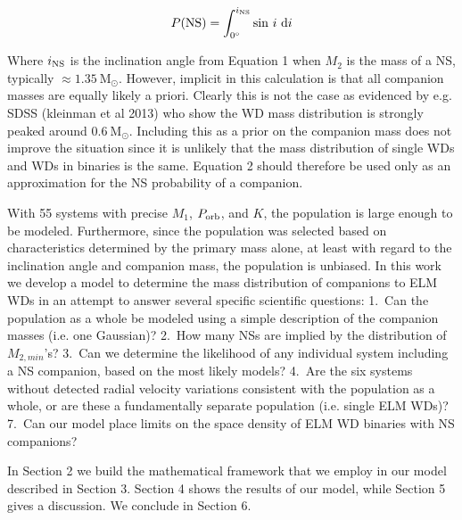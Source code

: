 \documentclass[letterpaper,12pt,preprint]{aastex}
\newcommand{\Msun}{\mathrm{M}_\odot}
\begin{document}
\begin{equation}
P({\rm NS}) = \int_{0^{\circ}}^{i_{\rm NS}} {\rm sin}\ i\ {\rm d}i
\end{equation}

Where $i_{\rm NS}$ is the inclination angle from Equation 1 when $M_2$ is the mass of a NS, typically $\approx1.35~\Msun$. However, implicit in this calculation is that all companion masses are equally likely a priori. Clearly this is not the case as evidenced by e.g. SDSS (kleinman et al 2013) who show the WD mass distribution is strongly peaked around $0.6~\Msun$. Including this as a prior on the companion mass does not improve the situation since it is unlikely that the mass distribution of single WDs and WDs in binaries is the same. Equation 2 should therefore be used only as an approximation for the NS probability of a companion.


With 55 systems with precise $M_1$, $P_{\rm orb}$, and $K$, the population is large enough to be modeled. Furthermore, since the population was selected based on characteristics determined by the primary mass alone, at least with regard to the inclination angle and companion mass, the population is unbiased. In this work we develop a model to determine the mass distribution of companions to ELM WDs in an attempt to answer several specific scientific questions: 1.\ Can the population as a whole be modeled using a simple description of the companion masses (i.e. one Gaussian)? 2.\ How many NSs are implied by the distribution of $M_{2,min}$'s? 3.\ Can we determine the likelihood of any individual system including a NS companion, based on the most likely models? 4.\ Are the six systems without detected radial velocity variations consistent with the population as a whole, or are these a fundamentally separate population (i.e. single ELM WDs)? 7.\ Can our model place limits on the space density of ELM WD binaries with NS companions? 


In Section 2 we build the mathematical framework that we employ in our model described in Section 3. Section 4 shows the results of our model, while Section 5 gives a discussion. We conclude in Section 6.

\end{document}
